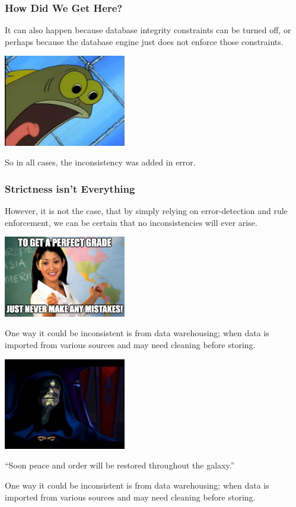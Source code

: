 \begin{frame}
\frametitle{How Did We Get Here?}

It can also happen because database integrity constraints can be turned off, or perhaps because the database engine just does not enforce those constraints. 

\begin{center}
	\includegraphics[width=0.4\textwidth]{images/youwhat.jpg}
\end{center}

So in all cases, the inconsistency was added in error. 

\end{frame}


\begin{frame}
\frametitle{Strictness isn't Everything}

However, it is not the case, that by simply relying on error-detection and rule enforcement, we can be certain that no inconsistencies will ever arise. 

\begin{center}
	\includegraphics[width=0.4\textwidth]{images/mistakes.jpg}
\end{center}

One way it could be inconsistent is from data warehousing; when data is imported from various sources and may need cleaning before storing. 

\begin{center}
	\includegraphics[width=0.4\textwidth]{images/peaceorder.jpg}
\end{center}
\hfill ``Soon peace and order will be restored throughout the galaxy.''

One way it could be inconsistent is from data warehousing; when data is imported from various sources and may need cleaning before storing. 

\end{frame}


